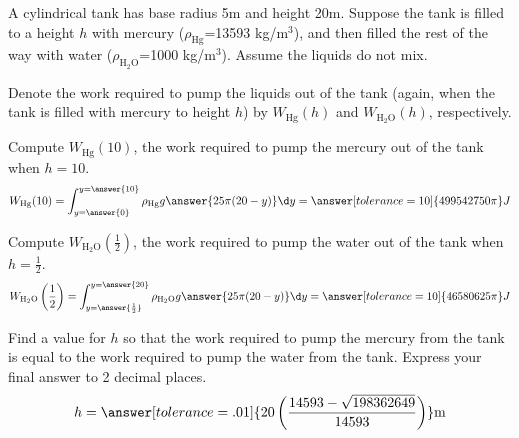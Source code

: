 \documentclass{ximera}
\author{Jim Talamo and Alex Beckwith}
\begin{document}
\begin{exercise}

A cylindrical tank has base radius 5m and height 20m. Suppose the tank is filled to a height $h$ with mercury ($\rho_{\text{Hg}}$=13593 kg/m$^3$), and then filled the rest of the way with water ($\rho_{\text{H$_2$O}}$=1000 kg/m$^3$). Assume the liquids do not mix. 

Denote the work required to pump the liquids out of the tank (again, when the tank is filled with mercury to height $h$) by $W_{\text{Hg}}(h)$ and $W_{\text{H$_2$O}}(h)$, respectively.

\begin{image}
\end{image}

Compute $W_{\text{Hg}}(10)$, the work required to pump the mercury out of the tank when $h=10$.
\[
W_{\text{Hg}}(10) 
	= \int_{y=\answer{0}}^{y=\answer{10}} \rho_{\text{Hg}} g \answer{25 \pi (20-y)} \d y = \answer[tolerance=10]{499542750 \pi }J
\]

Compute $W_{\text{H$_2$O}}\left(\frac{1}{2}\right)$, the work required to pump the water out of the tank when $h= \frac{1}{2}$.
\[
W_{\text{H$_2$O}}\left(\frac{1}{2}\right) 
	= \int_{y=\answer{\frac{1}{2}}}^{y=\answer{20}} \rho_{\text{H$_2$O}} g \answer{25\pi (20-y)} \d y = \answer[tolerance=10]{46580625 \pi}J
\]

Find a value for $h$ so that the work required to pump the mercury from the tank is equal to the work required to pump the water from the tank.  Express your final answer to 2 decimal places.
\[
h=\answer[tolerance=.01]{20 \left(\frac{14593 - \sqrt{198362649}}{14593} \right)} \text{m}
\]
\end{exercise}
\end{document}
